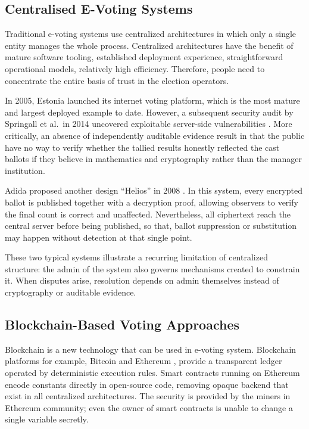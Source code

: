 \subsection{Centralised E-Voting Systems}

Traditional e-voting systems use centralized architectures in which only a single entity manages the whole process. Centralized architectures have the benefit of mature software tooling, established deployment experience, straightforward operational models, relatively high efficiency. Therefore, people need to concentrate the entire basis of trust in the election operators.

In 2005, Estonia launched its internet voting platform, which is the most mature and largest deployed example to date. However, a subsequent security audit by Springall et al.\ in 2014 uncovered exploitable server-side vulnerabilities \cite{springall2014}. More critically, an absence of independently auditable evidence result in that the public have no way to verify whether the tallied results honestly reflected the cast ballots if they believe in mathematics and cryptography rather than the manager institution.

Adida proposed another design ``Helios'' in 2008 \cite{adida2008}. In this system, every encrypted ballot is published together with a decryption proof, allowing observers to verify the final count is correct and unaffected. Nevertheless, all ciphertext reach the central server before being published, so that, ballot suppression or substitution may happen without detection at that single point.

These two typical systems illustrate a recurring limitation of centralized structure: the admin of the system also governs mechanisms created to constrain it. When disputes arise, resolution depends on admin themselves instead of cryptography or auditable evidence.

\subsection{Blockchain-Based Voting Approaches}

Blockchain is a new technology that can be used in e-voting system. Blockchain platforms for example, Bitcoin \cite{nakamoto2008} and Ethereum \cite{wood2014}, provide a transparent ledger operated by deterministic execution rules. Smart contracts running on Ethereum encode constants directly in open-source code, removing opaque backend that exist in all centralized architectures. The security is provided by the miners in Ethereum community; even the owner of smart contracts is unable to change a single variable secretly.


